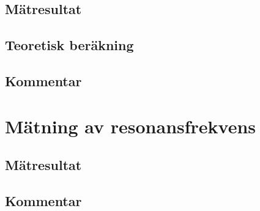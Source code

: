 \documentclass[11pt,a4paper]{article}
\begin{document}
\subsection{Mätresultat}\label{}

\subsection{Teoretisk beräkning}\label{}

\subsection{Kommentar}\label{}


\section{Mätning av resonansfrekvens}\label{}

\subsection{Mätresultat}\label{}

\subsection{Kommentar}\label{}
\end{document}
